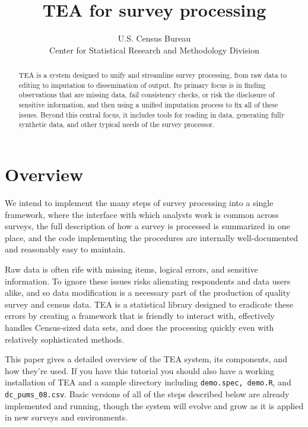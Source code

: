 \documentclass{article}
\begin{document}
\author{U.S. Census Bureau\\Center for Statistical Research and Methodology Division}
\title{TEA for survey processing}
\maketitle

\begin{abstract}
TEA is a system designed to unify and streamline survey processing, from raw data to
editing to imputation to dissemination of output. Its primary focus is in finding 
observations that are missing data, fail consistency checks, or risk the disclosure of
sensitive information, and then using a unified imputation process to fix all of these
issues. Beyond this central focus, it includes tools for reading in data, generating
fully synthetic data, and other typical needs of the survey processor.
\end{abstract}


\section{Overview}
{\sc We intend} to implement the many steps of survey processing into a single
framework, where the interface with which analysts work is common across surveys,
the full description of how a survey is processed is summarized in one place, and the
code implementing the procedures are internally well-documented and reasonably easy
to maintain.

Raw data is often rife with missing items, logical errors, and sensitive information. 
To ignore these issues risks alienating respondents and data users alike, and so data 
modification is a necessary part of the production of quality survey and census data. 
TEA is a statistical library designed to eradicate these errors by creating a framework 
that is friendly to interact with, effectively handles Census-sized data sets, and does 
the processing quickly even with relatively sophisticated methods.

This paper gives a detailed overview of the TEA system, its components, and how they're 
used. If you have this tutorial you should also have a working installation of TEA and 
a sample directory including {\tt demo.spec, demo.R}, and {\tt dc\_pums\_08.csv}. 
Basic versions of all of the steps described below are already implemented and running,
though the system will evolve and grow as it is applied in new surveys and environments.
\end{document}
